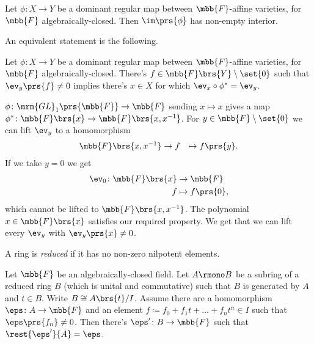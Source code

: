 \documentclass[10pt,a4paper,twoside,openany,hidelinks]{book}
\begin{document}
\begin{theorem}\label{theorem:nonempty_interior}
Let $\phi \colon X \to Y$ be a dominant regular map between $\mbb{F}$-affine varieties, for $\mbb{F}$ algebraically-closed.
Then $\im\prs{\phi}$ has non-empty interior.
\end{theorem}

An equivalent statement is the following.

\begin{theorem}
Let $\phi \colon X \to Y$ be a dominant regular map between $\mbb{F}$-affine varieties, for $\mbb{F}$ algebraically-closed. There's $f \in \mbb{F}\brs{Y} \setminus \set{0}$ such that $\ev_y\prs{f} \neq 0$ implies there's $x \in X$ for which $\ev_x \circ \phi^* = \ev_y$.
\end{theorem}

\begin{example}
$\phi \colon \mrm{GL}_1\prs{\mbb{F}} \to \mbb{F}$ sending $x \mapsto x$ gives a map $\phi^* \colon \mbb{F}\brs{x} \to \mbb{F}\brs{x,x^{-1}}$.
For $y \in \mbb{F} \setminus \set{0}$ we can lift $\ev_y$ to a homomorphism
\begin{align*}
\mbb{F}\brs{x,x^{-1}} &\to
f &\mapsto f\prs{y} \text{.}
\end{align*}
If we take $y=0$ we get
\begin{align*}
\ev_0 \colon \mbb{F}\brs{x} &\to \mbb{F} \\
f &\mapsto f\prs{0} \text{,}
\end{align*}
which cannot be lifted to $\mbb{F}\brs{x,x^{-1}}$. The polynomial $x \in \mbb{F}\brs{x}$ satisfies our required property.
We get that we can lift every $\ev_y$ with $\ev_y\prs{x} \neq 0$.
\end{example}

\begin{definition}
A ring is \emph{reduced} if it has no non-zero nilpotent elements.
\end{definition}

\begin{lemma}
Let $\mbb{F}$ be an algebraically-closed field. Let $A \rmono B$ be a subring of a reduced ring $B$ (which is unital and commutative) such that $B$ is generated by $A$ and $t \in B$. Write $B \cong A\brs{t} / I$. Assume there are a homomorphism $\eps \colon A \to \mbb{F}$ and an element $f \coloneqq f_0 + f_1 t + \ldots + f_n t^n \in I$ such that $\eps\prs{f_n} \neq 0$.
Then there's $\eps' \colon B \to \mbb{F}$ such that $\rest{\eps'}{A} = \eps$.
\end{lemma}
\end{document}
